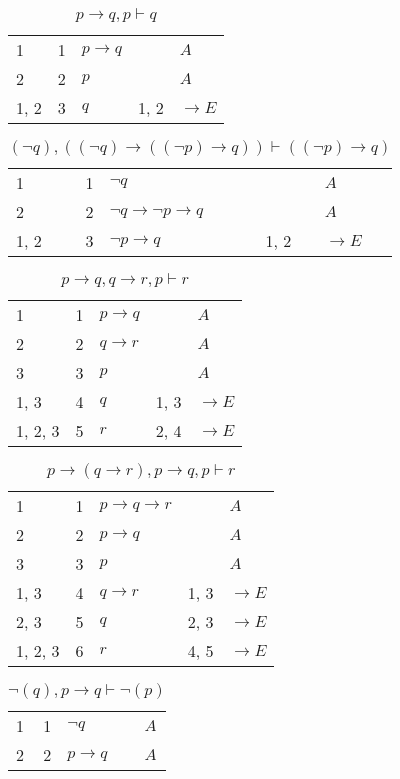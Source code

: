 \documentclass{article}
\begin{document}
\begin{table}[htbp]\caption*{$p→q,p ⊢ q$}\centering\begin{tabular}{lrlll}
{1} & 1 & $p→q$ & {} & $A$ \\
{2} & 2 & $p$ & {} & $A$ \\
{1, 2} & 3 & $q$ & {1, 2} & $→E$ \\
\end{tabular}
\end{table}\begin{table}[htbp]\caption*{$(¬q),((¬q)→((¬p)→q)) ⊢ ((¬p)→q)$}\centering\begin{tabular}{lrlll}
{1} & 1 & $¬q$ & {} & $A$ \\
{2} & 2 & $¬q→ ¬p→q$ & {} & $A$ \\
{1, 2} & 3 & $¬p→q$ & {1, 2} & $→E$ \\
\end{tabular}
\end{table}\begin{table}[htbp]\caption*{$p→q,q→r,p ⊢ r$}\centering\begin{tabular}{lrlll}
{1} & 1 & $p→q$ & {} & $A$ \\
{2} & 2 & $q→r$ & {} & $A$ \\
{3} & 3 & $p$ & {} & $A$ \\
{1, 3} & 4 & $q$ & {1, 3} & $→E$ \\
{1, 2, 3} & 5 & $r$ & {2, 4} & $→E$ \\
\end{tabular}
\end{table}\begin{table}[htbp]\caption*{$p→(q→r),p→q,p ⊢ r$}\centering\begin{tabular}{lrlll}
{1} & 1 & $p→q→r$ & {} & $A$ \\
{2} & 2 & $p→q$ & {} & $A$ \\
{3} & 3 & $p$ & {} & $A$ \\
{1, 3} & 4 & $q→r$ & {1, 3} & $→E$ \\
{2, 3} & 5 & $q$ & {2, 3} & $→E$ \\
{1, 2, 3} & 6 & $r$ & {4, 5} & $→E$ \\
\end{tabular}
\end{table}\begin{table}[htbp]\caption*{$¬(q),p→q ⊢ ¬(p)$}\centering\begin{tabular}{lrlll}
{1} & 1 & $¬q$ & {} & $A$ \\
{2} & 2 & $p→q$ & {} & $A$ \\

\end{tabular}
\end{table}
\end{document}

